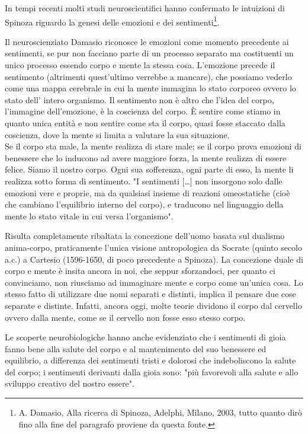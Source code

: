 In tempi recenti molti studi neuroscientifici hanno confermato le intuizioni di Spinoza riguardo la genesi delle emozioni e dei sentimenti\footnote{A. Damasio, Alla ricerca di Spinoza, Adelphi, Milano, 2003, tutto quanto dirò fino alla fine del paragrafo proviene da questa fonte.}.

Il neuroscienziato Damasio riconosce le emozioni come momento precedente ai sentimenti, se pur non facciano parte di un processo separato ma costituenti un unico processo essendo
corpo e mente la stessa cosa. L'emozione precede
il sentimento (altrimenti quest'ultimo verrebbe a mancare), che possiamo vederlo come una mappa cerebrale in cui la mente immagina lo stato corporeo ovvero lo stato dell’ intero organismo. Il sentimento non è altro che l’idea del
corpo, l’immagine dell’emozione, è la coscienza del corpo. È sentire come stiamo in quanto unica entità e non sentire come sta il corpo, quasi fosse staccato dalla coscienza, dove la mente si limita a valutare la sua situazione. \\
Se il corpo sta male, la mente realizza di stare male; se il corpo prova
emozioni di benessere che lo inducono ad avere maggiore forza, la mente realizza di
essere felice. Siamo il nostro corpo. Ogni
sua sofferenza, ogni parte di esso, la mente li realizza sotto forma di sentimento. "I sentimenti […] non insorgono solo dalle emozioni vere e proprie, ma da qualsiasi insieme di
reazioni omeostatiche (cioè che cambiano l'equilibrio interno del corpo), e traducono nel linguaggio della mente lo stato vitale in cui versa
l’organismo".

Risulta completamente ribaltata la concezione dell'uomo basata sul dualismo anima-corpo, praticamente l'unica visione antropologica da Socrate (quinto secolo a.c.) a Cartesio (1596-1650, di poco precedente a Spinoza). La concezione duale di corpo e mente è insita ancora in noi, che seppur sforzandoci,
per quanto ci convinciamo, non riusciamo ad immaginare mente e corpo come un'unica
cosa. Lo stesso fatto di utilizzare due nomi separati e distinti, implica il pensare due
cose separate e distinte. Infatti, ancora oggi, molte teorie dividono il corpo dal cervello
ovvero dalla mente, come se il cervello non fosse esso stesso corpo. 

Le scoperte neurobiologiche hanno anche
evidenziato che i sentimenti di gioia fanno bene alla salute del corpo e al mantenimento del suo benessere ed
equilibrio, a differenza dei sentimenti tristi e dolorosi che indeboliscono la salute del
corpo; i sentimenti derivanti dalla gioia sono: "più favorevoli
alla salute e allo sviluppo creativo del nostro essere".
\newpage

